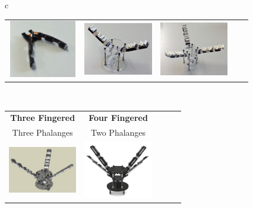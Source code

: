 \begin{figure}[ht!]
\begin{center}
\begin{tabular}{ c }
\begin{tabular}{ c  c  c  c  c }
	\includegraphics[height=2.5cm,width=3cm]{figures/Intro/Real_Aerial_Gripper.jpg}&
	\includegraphics[height=2.5cm,width=3cm]{figures/Intro/RealRobotHand_2Fingered.jpg}&
	\includegraphics[height=2.5cm,width=3cm]{figures/Intro/RealRobotHand_3Fingered2Phalanges.jpg}\\
\end{tabular}\\
\begin{tabular}{ c  c  c  c  c }
	\bf{Three Fingered} & \bf{Four Fingered} \\
	{Three Phalanges} & {Two Phalanges} \\

	\includegraphics[height=2.5cm,width=3cm]{figures/Intro/RobotHand_3Fingered3Phalanges.jpg}&
	\includegraphics[height=2.5cm,width=3cm]{figures/Intro/RobotHand.jpg}\\


\end{tabular}
\end{tabular}
\end{center}
\end{figure}
